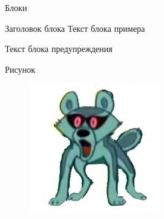 \documentclass[11pt]{beamer}
\begin{document}
\begin{frame}{Блоки}

\begin{block}{Заголовок блока}
	Текст блока примера
\end{block}

\begin{alertblock}{}
	Текст блока предупреждения 
\end{alertblock}

\end{frame}

\begin{frame}{Рисунок}
\begin{figure}[H]
	\includegraphics[scale=0.4]{../pics/shakal.png}
	\label{fig:shakal}
\end{figure}
\end{frame}
\end{document}
